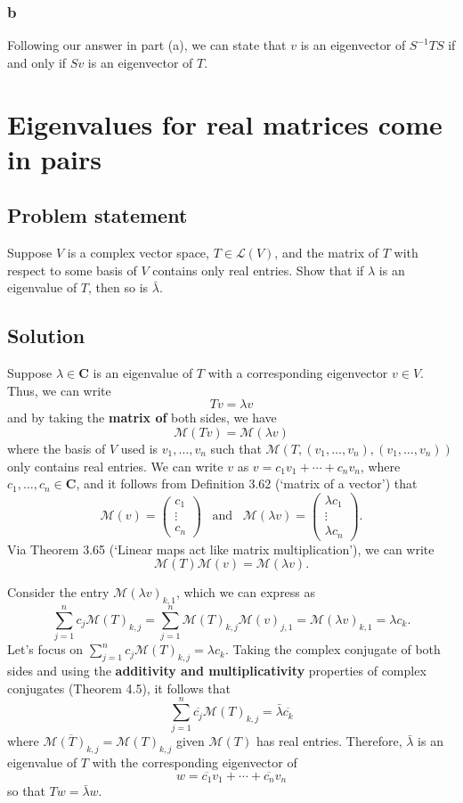 \documentclass{article}
\begin{document}
\subsubsection*{b}
Following our answer in part (a), we can state that $v$ is an eigenvector of $S^{-1}TS$ if and only if $Sv$ is an eigenvector of $T$.

\clearpage

\section{Eigenvalues for real matrices come in pairs}
\subsection*{Problem statement}
Suppose $V$ is a complex vector space, $T\in\mathcal{L}(V)$, and the matrix of $T$ with respect to some basis of $V$ contains only real entries. 
Show that if $\lambda$ is an eigenvalue of $T$, then so is $\bar{\lambda}$.

\subsection*{Solution}
Suppose $\lambda\in\mathbf{C}$ is an eigenvalue of $T$ with a corresponding eigenvector $v\in V$. 
Thus, we can write
\[Tv=\lambda v\]
and by taking the \textbf{matrix of} both sides, we have
\[\mathcal{M}(Tv)=\mathcal{M}(\lambda v)\]
where the basis of $V$ used is $v_1,\ldots,v_n$ such that $\mathcal{M}(T,(v_1,\ldots,v_n),(v_1,\ldots,v_n))$ only contains real entries. 
We can write $v$ as $v=c_1v_1+\cdots+c_nv_n$, where $c_1,\ldots,c_n\in\mathbf{C}$, and it follows from Definition 3.62 (`matrix of a vector') that 
\[\mathcal{M}(v)=\begin{pmatrix}c_1\\\vdots\\c_n\end{pmatrix}\;\;\;\text{and}\;\;\;\mathcal{M}(\lambda v)=\begin{pmatrix}\lambda c_1\\\vdots\\\lambda c_n\end{pmatrix}.\]
Via Theorem 3.65 (`Linear maps act like matrix multiplication'), we can write
\[\mathcal{M}(T)\mathcal{M}(v)=\mathcal{M}(\lambda v).\]

Consider the entry $\mathcal{M}(\lambda v)_{k,1}$, which we can express as
\[\sum^{n}_{j=1}c_{j}\mathcal{M}(T)_{k,j}=\sum^{n}_{j=1}\mathcal{M}(T)_{k,j}\mathcal{M}(v)_{j,1}=\mathcal{M}(\lambda v)_{k,1}=\lambda c_k.\]
Let's focus on $\sum^{n}_{j=1}c_{j}\mathcal{M}(T)_{k,j}=\lambda c_k$. 
Taking the complex conjugate of both sides and using the \textbf{additivity and multiplicativity} properties of complex conjugates (Theorem 4.5), it follows that
\[\sum^{n}_{j=1}\overline{c_{j}}\mathcal{M}(T)_{k,j}=\bar{\lambda}\overline{c_k}\]
where $\overline{\mathcal{M}(T)_{k,j}}=\mathcal{M}(T)_{k,j}$ given $\mathcal{M}(T)$ has real entries. 
Therefore, $\bar{\lambda}$ is an eigenvalue of $T$ with the corresponding eigenvector of 
\[w=\overline{c_1}v_1+\cdots+\overline{c_n}v_n\]
so that $Tw=\bar{\lambda}w$.
\end{document}
